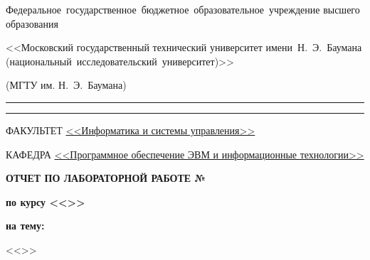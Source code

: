 \begin{titlepage}
\begin{center}
\begin{minipage}{0.85\textwidth}
{                    %
                    {Федеральное~государственное~бюджетное~образовательное~учреждение высшего образования}

                    {<<Московский государственный технический университет имени~Н.~Э.~Баумана (национальный~исследовательский~университет)>>}

                    {(МГТУ им. Н.~Э.~Баумана)}
                    \vspace{0.1cm}
                }
            \end{minipage}

        \vspace{0.2cm}
        \rule{\linewidth}{2.8pt}
        \rule[3ex]{\linewidth}{1pt}

        \begin{flushleft}
            {ФАКУЛЬТЕТ \uline{<<Информатика и системы управления>> \hfill}}

            \vspace{0.5cm}

            {КАФЕДРА \uline{<<Программное обеспечение ЭВМ и информационные технологии>> \hfill}}
        \end{flushleft}

        \vfill

        {
            \Large{\textbf{
                {ОТЧЕТ ПО ЛАБОРАТОРНОЙ РАБОТЕ №\labnumber}
            }}

            \Large{\textbf{
                {по курсу <<\coursename>>}
            }}

            \Large{\textbf{
                {на тему:}
            }}

            \large{<<\labtheme>>}

            \vspace{0.5cm}
        }

        \vspace{0.5cm}



\end{center}
\end{titlepage}
